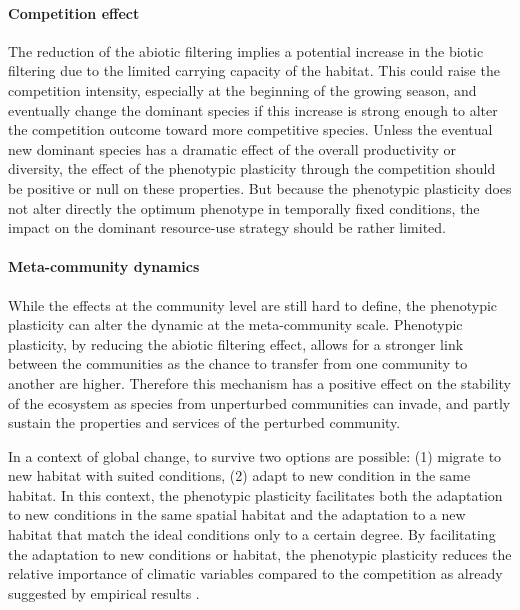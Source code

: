 \paragraph{Competition effect}

The reduction of the abiotic filtering implies a potential increase in the biotic filtering due to the limited carrying capacity of the habitat. This could raise the competition intensity, especially at the beginning of the growing season, and eventually change the dominant species if this increase is strong enough to alter the competition outcome toward more competitive species. Unless the eventual new dominant species has a dramatic effect of the overall productivity or diversity, the effect of the phenotypic plasticity through the competition should be positive or null on these properties. But because the phenotypic plasticity does not alter directly the optimum phenotype in temporally fixed conditions, the impact on the dominant resource-use strategy should be rather limited.

\paragraph{Meta-community dynamics}

While the effects at the community level are still hard to define, the phenotypic plasticity can alter the dynamic at the meta-community scale. Phenotypic plasticity, by reducing the abiotic filtering effect, allows for a stronger link between the communities as the chance to transfer from one community to another are higher. Therefore this mechanism has a positive effect on the stability of the ecosystem as species from unperturbed communities can invade, and partly sustain the properties and services of the perturbed community.

In a context of global change, to survive two options are possible: (1) migrate to new habitat with suited conditions, (2) adapt to new condition in the same habitat. In this context, the phenotypic plasticity facilitates both the adaptation to new conditions in the same spatial habitat and the adaptation to a new habitat that match the ideal conditions only to a certain degree. By facilitating the adaptation to new conditions or habitat, the phenotypic plasticity reduces the relative importance of climatic variables compared to the competition as already suggested by empirical results \parencite{alexander_novel_2015}.\\


